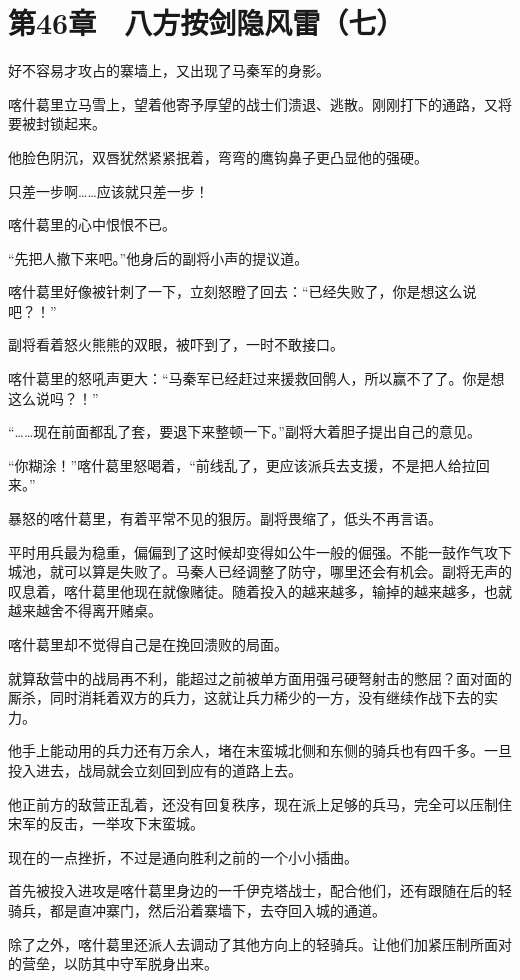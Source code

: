 \section{第46章　八方按剑隐风雷（七）}

好不容易才攻占的寨墙上，又出现了马秦军的身影。

喀什葛里立马雪上，望着他寄予厚望的战士们溃退、逃散。刚刚打下的通路，又将要被封锁起来。

他脸色阴沉，双唇犹然紧紧抿着，弯弯的鹰钩鼻子更凸显他的强硬。

只差一步啊……应该就只差一步！

喀什葛里的心中恨恨不已。

“先把人撤下来吧。”他身后的副将小声的提议道。

喀什葛里好像被针刺了一下，立刻怒瞪了回去：“已经失败了，你是想这么说吧？！”

副将看着怒火熊熊的双眼，被吓到了，一时不敢接口。

喀什葛里的怒吼声更大：“马秦军已经赶过来援救回鹘人，所以赢不了了。你是想这么说吗？！”

“……现在前面都乱了套，要退下来整顿一下。”副将大着胆子提出自己的意见。

“你糊涂！”喀什葛里怒喝着，“前线乱了，更应该派兵去支援，不是把人给拉回来。”

暴怒的喀什葛里，有着平常不见的狠厉。副将畏缩了，低头不再言语。

平时用兵最为稳重，偏偏到了这时候却变得如公牛一般的倔强。不能一鼓作气攻下城池，就可以算是失败了。马秦人已经调整了防守，哪里还会有机会。副将无声的叹息着，喀什葛里他现在就像赌徒。随着投入的越来越多，输掉的越来越多，也就越来越舍不得离开赌桌。

喀什葛里却不觉得自己是在挽回溃败的局面。

就算敌营中的战局再不利，能超过之前被单方面用强弓硬弩射击的憋屈？面对面的厮杀，同时消耗着双方的兵力，这就让兵力稀少的一方，没有继续作战下去的实力。

他手上能动用的兵力还有万余人，堵在末蛮城北侧和东侧的骑兵也有四千多。一旦投入进去，战局就会立刻回到应有的道路上去。

他正前方的敌营正乱着，还没有回复秩序，现在派上足够的兵马，完全可以压制住宋军的反击，一举攻下末蛮城。

现在的一点挫折，不过是通向胜利之前的一个小小插曲。

首先被投入进攻是喀什葛里身边的一千伊克塔战士，配合他们，还有跟随在后的轻骑兵，都是直冲寨门，然后沿着寨墙下，去夺回入城的通道。

除了之外，喀什葛里还派人去调动了其他方向上的轻骑兵。让他们加紧压制所面对的营垒，以防其中守军脱身出来。

